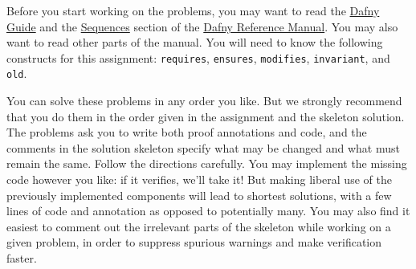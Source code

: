 \documentclass{handout}
\begin{document}
Before you start working on the problems, you may want to read  the
\href{https://dafny-lang.github.io/dafny/OnlineTutorial/guide}{Dafny Guide} and the
\href{https://dafny-lang.github.io/dafny/DafnyRef/DafnyRef#sec-sequences}{Sequences}
section of the \href{https://dafny-lang.github.io/dafny/DafnyRef/DafnyRef#sec-sequences}{Dafny Reference Manual}.
You may also want to read other parts of the manual.  You will need to know the following
constructs for this assignment: \lstinline{requires}, \lstinline{ensures},
\lstinline{modifies}, \lstinline{invariant}, and \lstinline{old}.

You can solve these problems in any order you like.  But we strongly recommend
that you do them in the order given in the assignment and the skeleton solution.
The problems ask you to write both proof annotations and code, and the comments
in the solution skeleton specify what may be changed and what must remain the
same.  Follow the directions carefully. You may implement the missing code
however you like: if it verifies, we'll take it!  But making liberal use of the
previously implemented components will lead to shortest solutions, with a few
lines of code and annotation as opposed to potentially many. You may also find
it easiest to comment out the irrelevant parts of the skeleton while working on
a given problem, in order to suppress spurious warnings and make verification
faster.
\end{document}
